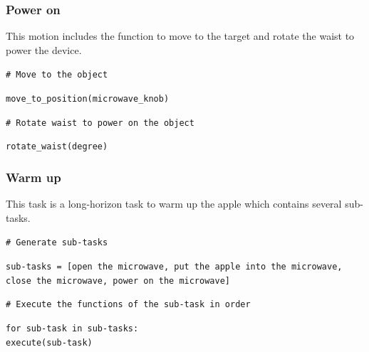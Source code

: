 \documentclass[letterpaper,conference]{ieeeconf}
\begin{document}
\subsubsection{Power on}
This motion includes the function to move to the target and rotate the waist to power the device.
\begin{codebox}
\textcolor{codegreen}{\footnotesize \texttt{\# Move to the object}}\\
\colorbox{codeblue}{%
    \begin{minipage}{\dimexpr\textwidth-6pt\relax}
        \footnotesize \texttt{move\_to\_position(microwave\_knob)}
    \end{minipage}%
}
\textcolor{codegreen}{\footnotesize \texttt{\# Rotate waist to power on the object}}\\
\colorbox{codeblue}{%
    \begin{minipage}{\dimexpr\textwidth-6pt\relax}
        \footnotesize \texttt{rotate\_waist(degree)}
    \end{minipage}%
}
\end{codebox}
\vspace{-1.5mm}
\subsubsection{Warm up}
This task is a long-horizon task to warm up the apple which contains several sub-tasks.
\begin{codebox}
\textcolor{codegreen}{\footnotesize \texttt{\# Generate sub-tasks}}\vspace*{1mm}\\
\colorbox{codeblue}{%
    \begin{minipage}{\dimexpr\textwidth-6pt\relax}
       \footnotesize  \texttt{sub-tasks = [\textquotesingle open the microwave\textquotesingle , \textquotesingle put the apple into the microwave\textquotesingle , \textquotesingle close the microwave\textquotesingle , \textquotesingle power on the microwave\textquotesingle ]}
    \end{minipage}%
}
\textcolor{codegreen}{\footnotesize \texttt{\# Execute the functions of the sub-task in order}\vspace{1mm}}\\
\colorbox{longhri}{%
    \begin{minipage}{\dimexpr\textwidth-6pt\relax}
        \footnotesize \texttt{for sub-task in sub-tasks:\\
            \hspace*{0.5cm}execute(sub-task)}
    \end{minipage}%
}
\end{codebox}
\vspace{-1.5mm}
\end{document}
